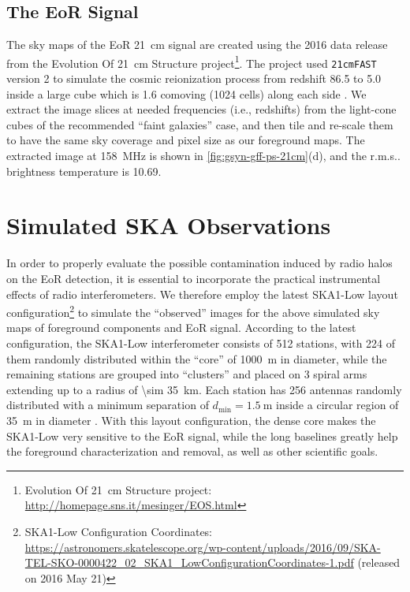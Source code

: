 \documentclass[modern]{aastex62}
\makeatletter
\newcommand{\R}[1]{\mathrm{#1}}
\newcommand{\rms}{r.m.s\@ifnextchar.{}{.\@}}
\makeatother
\begin{document}
\subsection{The EoR Signal}
\label{sec:eor-signal}

The sky maps of the EoR 21~cm signal are created using the 2016
data release from the Evolution Of 21~cm Structure project\footnote{%
  Evolution Of 21~cm Structure project:
  \url{http://homepage.sns.it/mesinger/EOS.html}}.
The project used \texttt{21cmFAST} version 2 \citep{mesinger2011} to
simulate the cosmic reionization process from redshift 86.5 to 5.0 inside
a large cube which is 1.6 comoving \si{\Gpc} (1024 cells) along each side
\citep{mesinger2016}.
We extract the image slices at needed frequencies (i.e., redshifts) from
the light-cone cubes of the recommended \enquote{faint galaxies} case,
and then tile and re-scale them to have the same sky coverage and
pixel size as our foreground maps.
The extracted image at \SI{158}{\MHz} is shown in
\autoref{fig:gsyn-gff-ps-21cm}(d),
and the \rms{} brightness temperature is \SI{10.69}{\mK}.


\section{Simulated SKA Observations}
\label{sec:obs-simu}

In order to properly evaluate the possible contamination induced by radio
halos on the EoR detection, it is essential to incorporate the practical
instrumental effects of radio interferometers.
We therefore employ the latest SKA1-Low layout configuration\footnote{%
  SKA1-Low Configuration Coordinates:
  \url{https://astronomers.skatelescope.org/wp-content/uploads/2016/09/SKA-TEL-SKO-0000422_02_SKA1_LowConfigurationCoordinates-1.pdf}
  (released on 2016 May 21)
}
to simulate the \enquote{observed} images for the above simulated sky
maps of foreground components and EoR signal.
According to the latest configuration,
the SKA1-Low interferometer consists of 512 stations, with 224 of them
randomly distributed within the \enquote{core} of \SI{1000}{\meter} in
diameter, while the remaining stations are grouped into \enquote{clusters}
and placed on 3 spiral arms extending up to a radius of
\SI{\sim 35}{\kilo\meter}.
Each station has 256 antennas randomly distributed with a minimum separation
of $d_{\R{min}} = \SI{1.5}{\meter}$ inside a circular region of
\SI{35}{\meter} in diameter \citep[e.g.,][]{mort2017}.
With this layout configuration, the dense core makes the SKA1-Low very
sensitive to the EoR signal, while the long baselines greatly help the
foreground characterization and removal, as well as other scientific goals.
\end{document}
